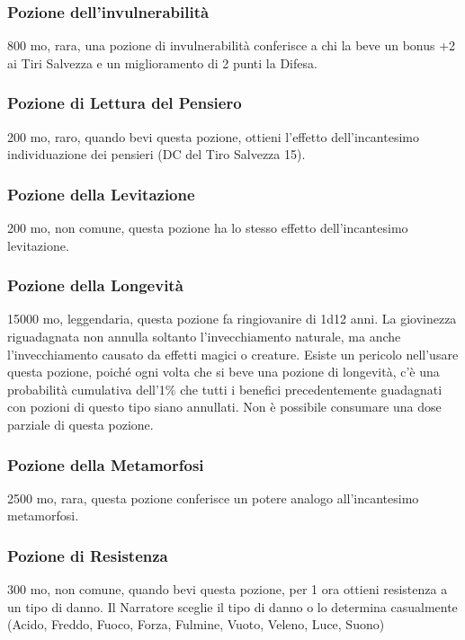 \begin{multicols}{2}
\subsubsection*{Pozione dell’invulnerabilità}
800 mo, rara, una pozione di invulnerabilità conferisce a chi la beve un bonus +2 ai Tiri Salvezza e un miglioramento di 2 punti la Difesa.

\subsubsection*{Pozione di Lettura del Pensiero}
200 mo, raro, quando bevi questa pozione, ottieni l'effetto dell'incantesimo individuazione dei pensieri (DC del Tiro Salvezza 15).

\subsubsection*{Pozione della Levitazione}
200 mo, non comune, questa pozione ha lo stesso effetto dell’incantesimo levitazione.

\subsubsection*{Pozione della Longevità}
15000 mo, leggendaria, questa pozione fa ringiovanire di 1d12 anni. La giovinezza riguadagnata non annulla soltanto l'invecchiamento naturale, ma anche l’invecchiamento causato da effetti magici o creature. Esiste un pericolo nell'usare questa pozione, poiché ogni volta che si beve una pozione di longevità, c'è una probabilità cumulativa dell’1\% che tutti i benefici precedentemente guadagnati con pozioni di questo tipo siano annullati. Non è possibile consumare una dose parziale di questa pozione.

\subsubsection*{Pozione della Metamorfosi}
2500 mo, rara, questa pozione conferisce un potere analogo all’incantesimo metamorfosi.

\subsubsection*{Pozione di Resistenza}
300 mo, non comune, quando bevi questa pozione, per 1 ora ottieni resistenza a un tipo di danno. Il Narratore sceglie il tipo di danno o lo determina casualmente (Acido, Freddo, Fuoco, Forza, Fulmine, Vuoto, Veleno, Luce, Suono)


\end{multicols}
